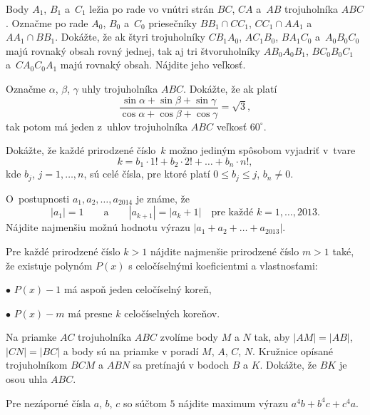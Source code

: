 {%
Body $A_1$, $B_1$ a~$C_1$ ležia po rade vo vnútri strán $BC$, $CA$ a~$AB$ trojuholníka $ABC$.
Označme po rade $A_0$, $B_0$ a~$C_0$ priesečníky $BB_1 \cap CC_1$, $CC_1 \cap AA_1$
a~$AA_1 \cap BB_1$. Dokážte, že ak štyri trojuholníky $CB_1A_0$, $AC_1B_0$, $BA_1C_0$ a~$A_0B_0C_0$  majú rovnaký obsah rovný jednej,
tak aj tri štvoruholníky $AB_0A_0B_1$, $BC_0B_0C_1$ a~$CA_0C_0A_1$ majú rovnaký obsah. Nájdite
jeho veľkosť.
}

{%
Označme $\alpha$, $\beta$, $\gamma$ uhly trojuholníka $ABC$. Dokážte, že ak platí
$$
\frac{\sin \alpha  + \sin \beta + \sin \gamma}{\cos \alpha + \cos \beta + \cos \gamma} = \sqrt{3},
$$
tak potom má jeden z~uhlov trojuholníka $ABC$ veľkosť $60^{\circ}$.
}

{%
Dokážte, že každé prirodzené číslo~$k$ možno jediným spôsobom vyjadriť v~tvare
$$
k= b_1 \cdot 1! + b_2 \cdot 2! + \dots + b_n \cdot n!,
$$
kde $b_j$, $j = 1, \dots, n$, sú celé čísla, pre ktoré platí
$0 \le b_j \le j$, $b_n \ne 0$.}

{%
O~postupnosti $a_1, a_2, \dots, a_{2014}$ je známe, že
$$
|a_1| = 1 \qquad \text{a} \qquad |a_{k+1}| = |a_k + 1| \quad \text{pre každé $k = 1, \dots, 2013$.}
$$
Nájdite najmenšiu možnú hodnotu výrazu $|a_1 + a_2 + \dots + a_{2013}|$.
}

{%
Pre každé prirodzené číslo $k>1$ nájdite najmenšie prirodzené číslo $m>1$ také, že existuje polynóm $P(x)$ s celočíselnými koeficientmi a vlastnosťami:
\item{$\bullet$} $P(x)-1$ má aspoň jeden celočíselný koreň,
\item{$\bullet$} $P(x)-m$ má presne $k$ celočíselných koreňov.
}

{%
Na priamke $AC$ trojuholníka $ABC$ zvolíme body $M$ a $N$ tak, aby $|AM|=|AB|$, $|CN|=|BC|$ a body sú na priamke v poradí $M$, $A$, $C$, $N$. Kružnice opísané trojuholníkom $BCM$ a $ABN$ sa pretínajú v bodoch $B$ a $K$. Dokážte, že $BK$ je osou uhla $ABC$.
}

{%
Pre nezáporné čísla $a$, $b$, $c$ so súčtom $5$ nájdite maximum výrazu $a^4b+b^4c+c^4a$.
}

